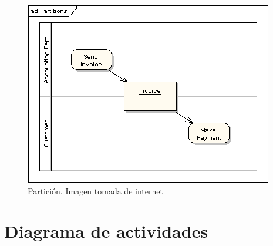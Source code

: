 \begin{itemize}
\begin{figure}[H]
	\centering
	\includegraphics[width=0.5\linewidth]{diseno/actividades/imgs/7}
	\caption{Partición. Imagen tomada de internet}
	\label{fig:gantt}
\end{figure}
\end{itemize}
\section{Diagrama de actividades}
